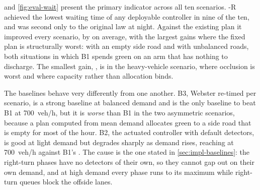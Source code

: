  and \cref{fig:eval-wait} present the primary indicator across all ten scenarios.
\prism{}-R achieved the lowest waiting time of any deployable controller in nine of the ten, and was second
only to the original law at night. Against the existing plan it improved every scenario, by  on
average, with the largest gains where the fixed plan is structurally worst:  with an empty side
road and  with unbalanced roads, both situations in which B1 spends green on an arm that has
nothing to discharge. The smallest gain, , is in the heavy-vehicle scenario, where occlusion is
worst and where capacity rather than allocation binds.

The baselines behave very differently from one another. B3, Webster re-timed per scenario, is a strong
baseline at balanced demand and is the only baseline to beat B1 at 700~veh/h, but it is \emph{worse} than
B1 in the two asymmetric scenarios, because a plan computed from mean demand allocates green to a side road
that is empty for most of the hour. B2, the \sumo{} actuated controller with default detectors, is good at
light demand but degrades sharply as demand rises, reaching  at 700~veh/h against B1's
. The cause is the one stated in \cref{sec:impl-baselines}: the right-turn phases have no
detectors of their own, so they cannot gap out on their own demand, and at high demand every phase runs to
its maximum while right-turn queues block the offside lanes.


